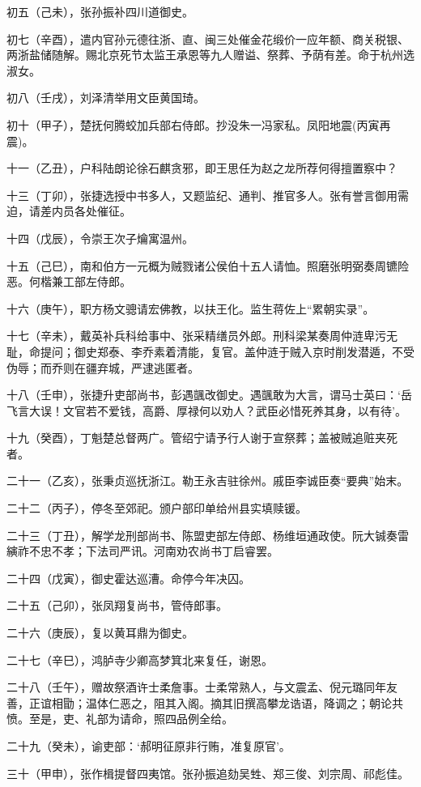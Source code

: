 \documentclass[]{article}
\begin{document}
初五（己未），张孙振补四川道御史。

初七（辛酉），遣内官孙元德往浙、直、闽三处催金花缎价一应年额、商关税银、两浙盐储随解。赐北京死节太监王承恩等九人赠谥、祭葬、予荫有差。命于杭州选淑女。

初八（壬戌），刘泽清举用文臣黄国琦。

初十（甲子），楚抚何腾蛟加兵部右侍郎。抄没朱一冯家私。凤阳地震(丙寅再震)。

十一（乙丑），户科陆朗论徐石麒贪邪，即王思任为赵之龙所荐何得擅置察中？

十三（丁卯），张捷选授中书多人，又题监纪、通判、推官多人。张有誉言御用需迫，请差内员各处催征。

十四（戊辰），令崇王次子爚寓温州。

十五（己巳），南和伯方一元概为贼戮诸公侯伯十五人请恤。照磨张明弼奏周镳险恶。何楷兼工部左侍郎。

十六（庚午），职方杨文骢请宏佛教，以扶王化。监生蒋佐上``累朝实录''。

十七（辛未），戴英补兵科给事中、张采精缮员外郎。刑科梁某奏周仲涟卑污无耻，命提问；御史郑泰、李乔素着清能，复官。盖仲涟于贼入京时削发潜遁，不受伪辱；而乔则在疆弃城，严逮逃匿者。

十八（壬申），张捷升吏部尚书，彭遇颽改御史。遇颽敢为大言，谓马士英曰：`岳飞言大误！文官若不爱钱，高爵、厚禄何以劝人？武臣必惜死养其身，以有待'。

十九（癸酉），丁魁楚总督两广。管绍宁请予行人谢于宣祭葬；盖被贼追赃夹死者。

二十一（乙亥），张秉贞巡抚浙江。勒王永吉驻徐州。戚臣李诚臣奏``要典''始末。

二十二（丙子），停冬至郊祀。颁户部印单给州县实填赎锾。

二十三（丁丑），解学龙刑部尚书、陈盟吏部左侍郎、杨维垣通政使。阮大铖奏雷縯祚不忠不孝；下法司严讯。河南劝农尚书丁启睿罢。

二十四（戊寅），御史霍达巡漕。命停今年决囚。

二十五（己卯），张凤翔复尚书，管侍郎事。

二十六（庚辰），复以黄耳鼎为御史。

二十七（辛巳），鸿胪寺少卿高梦箕北来复任，谢恩。

二十八（壬午），赠故祭酒许士柔詹事。士柔常熟人，与文震孟、倪元璐同年友善，正谊相勖；温体仁恶之，阻其入阁。摘其旧撰高攀龙诰语，降调之；朝论共愤。至是，吏、礼部为请命，照四品例全给。

二十九（癸未），谕吏部：`郝明征原非行贿，准复原官'。

三十（甲申），张作楫提督四夷馆。张孙振追劾吴甡、郑三俊、刘宗周、祁彪佳。
\end{document}
